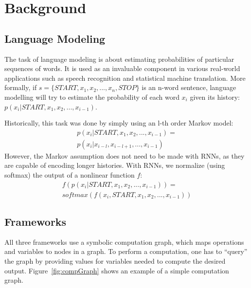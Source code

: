 \documentclass{article}
\begin{document}
\section{Background}
\subsection{Language Modeling}
The task of language modeling is about estimating probabilities of particular sequences of words. It is used as an invaluable component in various real-world applications such as speech recognition and statistical machine translation. More formally, if $s=\{START,x_1,x_2,...,x_n,STOP\}$ is an n-word sentence, language modelling will try to estimate
the probability of each word $x_i$ given its history: $p(x_i|START,x_1,x_2,...,x_{i-1})$. 

Historically, this task was done by simply using an l-th order Markov model:
\begin{align*}
    p(x_i|START,x_1,x_2,...,x_{i-1}) = \\
        p(x_i|x_{i-l},x_{i-l+1},...,x_{i-1})
\end{align*}
However, the Markov assumption does not need to be made with RNNs, as they are capable of encoding longer histories. With RNNs, we normalize (using softmax) the output of a nonlinear function $f$:
\begin{align*}
	f\left(p(x_i|START,x_1,x_2,...,x_{i-1})\right) = \\
		softmax\left(f(x_i,START,x_1,x_2,...,x_{i-1})\right)
\end{align*}

\subsection{Frameworks}
All three frameworks use a symbolic computation graph, which maps operations and variables to nodes in a graph. To perform a computation, one has to ``query'' the graph by providing values for variables needed to compute the desired output.
Figure~\ref{fig:compGraph} shows an example of a simple computation graph.
\end{document}
